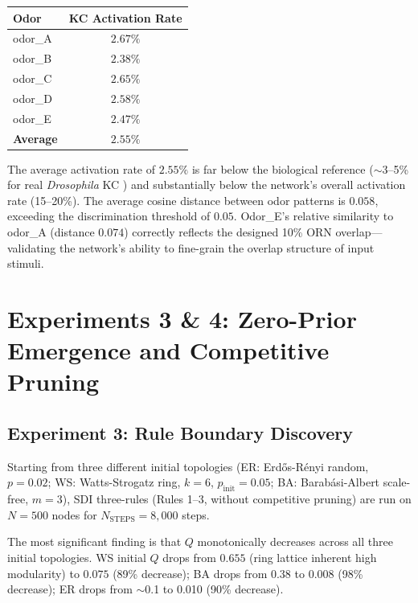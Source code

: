 \documentclass[12pt,a4paper]{article}
\begin{document}
\begin{center}
\begin{tabular}{lc}
\toprule
\textbf{Odor} & \textbf{KC Activation Rate} \\
\midrule
odor\_A & $2.67\%$ \\
odor\_B & $2.38\%$ \\
odor\_C & $2.65\%$ \\
odor\_D & $2.58\%$ \\
odor\_E & $2.47\%$ \\
\textbf{Average} & $\mathbf{2.55\%}$ \\
\bottomrule
\end{tabular}
\end{center}

The average activation rate of $2.55\%$ is far below the biological reference ($\sim$3--5\% for real \textit{Drosophila} KC \citep{perez2002}) and substantially below the network's overall activation rate (15--20\%). The average cosine distance between odor patterns is $0.058$, exceeding the discrimination threshold of $0.05$. Odor\_E's relative similarity to odor\_A (distance $0.074$) correctly reflects the designed 10\% ORN overlap---validating the network's ability to fine-grain the overlap structure of input stimuli.

\section{Experiments 3 \& 4: Zero-Prior Emergence and Competitive Pruning}

\subsection{Experiment 3: Rule Boundary Discovery}

Starting from three different initial topologies (ER: Erd\H{o}s-R\'{e}nyi random, $p=0.02$; WS: Watts-Strogatz ring, $k=6$, $p_{\text{init}}=0.05$; BA: Barab\'{a}si-Albert scale-free, $m=3$), SDI three-rules (Rules 1--3, without competitive pruning) are run on $N=500$ nodes for $N_{\text{STEPS}}=8{,}000$ steps.

The most significant finding is that $Q$ monotonically decreases across all three initial topologies. WS initial $Q$ drops from $0.655$ (ring lattice inherent high modularity) to $0.075$ (89\% decrease); BA drops from $0.38$ to $0.008$ (98\% decrease); ER drops from $\sim$0.1 to 0.010 (90\% decrease).
\end{document}
